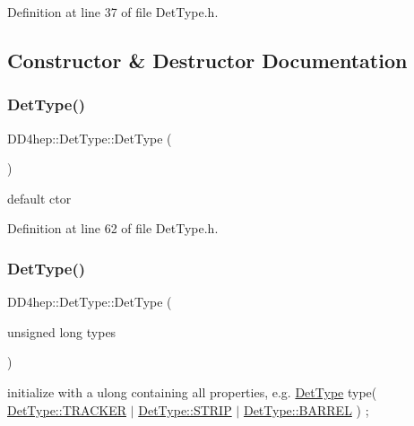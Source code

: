 Definition at line 37 of file Det\+Type.\+h.



\subsection{Constructor \& Destructor Documentation}
\hypertarget{class_d_d4hep_1_1_det_type_afd9299bbb49ac7016d966fb94ad090c8}{}\label{class_d_d4hep_1_1_det_type_afd9299bbb49ac7016d966fb94ad090c8} 
\subsubsection{\texorpdfstring{Det\+Type()}{DetType()}\hspace{0.1cm}{\footnotesize\ttfamily [1/2]}}
{\footnotesize\ttfamily D\+D4hep\+::\+Det\+Type\+::\+Det\+Type (\begin{DoxyParamCaption}{ }\end{DoxyParamCaption})\hspace{0.3cm}{\ttfamily [inline]}}



default c\textquotesingle{}tor 



Definition at line 62 of file Det\+Type.\+h.

\hypertarget{class_d_d4hep_1_1_det_type_a4d20c3eee13d6a2e8856fea8e266e36b}{}\label{class_d_d4hep_1_1_det_type_a4d20c3eee13d6a2e8856fea8e266e36b} 
\subsubsection{\texorpdfstring{Det\+Type()}{DetType()}\hspace{0.1cm}{\footnotesize\ttfamily [2/2]}}
{\footnotesize\ttfamily D\+D4hep\+::\+Det\+Type\+::\+Det\+Type (\begin{DoxyParamCaption}\item[{unsigned long}]{types }\end{DoxyParamCaption})\hspace{0.3cm}{\ttfamily [inline]}}

initialize with a ulong containing all properties, e.\+g. \hyperlink{class_d_d4hep_1_1_det_type}{Det\+Type} type( \hyperlink{class_d_d4hep_1_1_det_type_aca757d7a9b865d1fb8f7997eb5c0a72cae974ecec59fd2a2900db7e5f44cd0884}{Det\+Type\+::\+T\+R\+A\+C\+K\+ER} $\vert$ \hyperlink{class_d_d4hep_1_1_det_type_aca757d7a9b865d1fb8f7997eb5c0a72ca47882873d22cd7ded73b8599713e5c98}{Det\+Type\+::\+S\+T\+R\+IP} $\vert$ \hyperlink{class_d_d4hep_1_1_det_type_aca757d7a9b865d1fb8f7997eb5c0a72caaca38656f429ac259f2aeb2a22359c1e}{Det\+Type\+::\+B\+A\+R\+R\+EL} ) ; 

